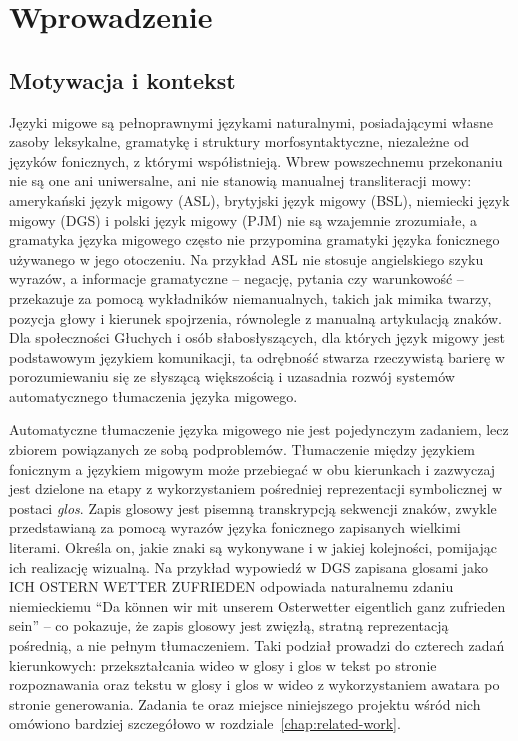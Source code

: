
\section{Wprowadzenie}
\label{chap:introduction}

\subsection{Motywacja i kontekst}
\label{sec:motivation-context}

Języki migowe są pełnoprawnymi językami naturalnymi, posiadającymi własne zasoby
leksykalne, gramatykę i struktury morfosyntaktyczne, niezależne od języków
fonicznych, z którymi współistnieją. Wbrew powszechnemu przekonaniu nie są one ani
uniwersalne, ani nie stanowią manualnej transliteracji mowy: amerykański język
migowy (ASL), brytyjski język migowy (BSL), niemiecki język migowy (DGS) i polski
język migowy (PJM) nie są wzajemnie zrozumiałe, a gramatyka języka migowego często
nie przypomina gramatyki języka fonicznego używanego w jego otoczeniu. Na przykład
ASL nie stosuje angielskiego szyku wyrazów, a informacje gramatyczne -- negację,
pytania czy warunkowość -- przekazuje za pomocą wykładników niemanualnych, takich
jak mimika twarzy, pozycja głowy i kierunek spojrzenia, równolegle z manualną
artykulacją znaków. Dla społeczności Głuchych i osób słabosłyszących, dla których
język migowy jest podstawowym językiem komunikacji, ta odrębność stwarza
rzeczywistą barierę w porozumiewaniu się ze słyszącą większością i uzasadnia
rozwój systemów automatycznego tłumaczenia języka migowego.

Automatyczne tłumaczenie języka migowego nie jest pojedynczym zadaniem, lecz
zbiorem powiązanych ze sobą podproblemów. Tłumaczenie między językiem fonicznym
a językiem migowym może przebiegać w obu kierunkach i zazwyczaj jest dzielone
na etapy z wykorzystaniem pośredniej reprezentacji symbolicznej w postaci
\emph{glos}. Zapis glosowy jest pisemną transkrypcją sekwencji znaków, zwykle
przedstawianą za pomocą wyrazów języka fonicznego zapisanych wielkimi literami.
Określa on, jakie znaki są wykonywane i w jakiej kolejności, pomijając ich
realizację wizualną. Na przykład wypowiedź w DGS zapisana glosami jako
ICH OSTERN WETTER ZUFRIEDEN odpowiada naturalnemu zdaniu niemieckiemu
``Da k\"onnen wir mit unserem Osterwetter eigentlich ganz zufrieden sein'' --
co pokazuje, że zapis glosowy jest zwięzłą, stratną reprezentacją pośrednią,
a nie pełnym tłumaczeniem. Taki podział prowadzi do czterech zadań kierunkowych:
przekształcania wideo w glosy i glos w tekst po stronie rozpoznawania oraz
tekstu w glosy i glos w wideo z wykorzystaniem awatara po stronie generowania.
Zadania te oraz miejsce niniejszego projektu wśród nich omówiono bardziej
szczegółowo w rozdziale~\ref{chap:related-work}.

